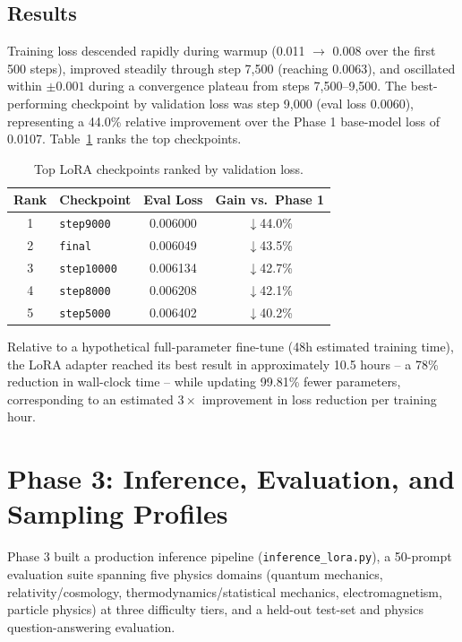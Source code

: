 \documentclass[11pt]{article}
\begin{document}
\subsection{Results}
Training loss descended rapidly during warmup (0.011 $\rightarrow$ 0.008
over the first 500 steps), improved steadily through step 7{,}500
(reaching 0.0063), and oscillated within $\pm0.001$ during a convergence
plateau from steps 7{,}500--9{,}500. The best-performing checkpoint by
validation loss was step 9{,}000 (eval loss 0.0060), representing a 44.0\%
relative improvement over the Phase 1 base-model loss of 0.0107.
Table~\ref{tab:checkpoints} ranks the top checkpoints.

\begin{table}[h]
\centering
\caption{Top LoRA checkpoints ranked by validation loss.}
\label{tab:checkpoints}
\begin{tabular}{@{}clcc@{}}
\toprule
Rank & Checkpoint & Eval Loss & Gain vs.\ Phase 1 \\
\midrule
1 & \texttt{step9000} & 0.006000 & $\downarrow$44.0\% \\
2 & \texttt{final} & 0.006049 & $\downarrow$43.5\% \\
3 & \texttt{step10000} & 0.006134 & $\downarrow$42.7\% \\
4 & \texttt{step8000} & 0.006208 & $\downarrow$42.1\% \\
5 & \texttt{step5000} & 0.006402 & $\downarrow$40.2\% \\
\bottomrule
\end{tabular}
\end{table}

Relative to a hypothetical full-parameter fine-tune (48h estimated training
time), the LoRA adapter reached its best result in approximately 10.5 hours
-- a 78\% reduction in wall-clock time -- while updating 99.81\% fewer
parameters, corresponding to an estimated $3\times$ improvement in loss
reduction per training hour.

\section{Phase 3: Inference, Evaluation, and Sampling Profiles}
Phase 3 built a production inference pipeline (\texttt{inference\_lora.py}),
a 50-prompt evaluation suite spanning five physics domains (quantum
mechanics, relativity/cosmology, thermodynamics/statistical mechanics,
electromagnetism, particle physics) at three difficulty tiers, and a
held-out test-set and physics question-answering evaluation.
\end{document}
